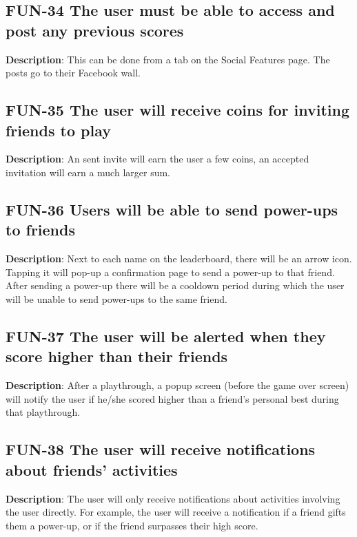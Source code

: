 \subsection{FUN-34 The user must be able to access and post any previous scores}
\textbf{Description}: This can be done from a tab on the Social Features
page. The posts go to their Facebook wall.

\subsection{FUN-35 The user will receive coins for inviting friends to play}
\textbf{Description}: An sent invite will earn the user a few coins,
an accepted invitation will earn a much larger sum. 

\subsection{FUN-36 Users will be able to send power-ups to friends}
\textbf{Description}: Next to each name on the leaderboard, there
will be an arrow icon. Tapping it will pop-up a confirmation page
to send a power-up to that friend. After sending a power-up there
will be a cooldown period during which the user will be unable to
send power-ups to the same friend.

\subsection{FUN-37 The user will be alerted when they score higher than their
friends}
\textbf{Description}: After a playthrough, a popup screen (before
the game over screen) will notify the user if he/she scored higher
than a friend\textquoteright{}s personal best during that playthrough.

\subsection{FUN-38 The user will receive notifications about friends\textquoteright{}
activities}
\textbf{Description}: The user will only receive notifications about
activities involving the user directly. For example, the user will
receive a notification if a friend gifts them a power-up, or if the
friend surpasses their high score.

